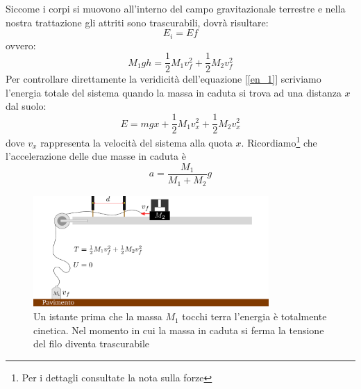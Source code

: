 \documentclass[a4paper,10pt,oneside]{article}
\begin{document}
Siccome i corpi si muovono all'interno del campo gravitazionale terrestre e nella nostra trattazione gli attriti sono trascurabili, dovrà risultare:
\begin{equation}
 E_i=Ef
\end{equation}
ovvero:
\begin{equation}\label{en_1}
 M_1gh=\frac 1 2 M_1v_f^2+\frac 1 2 M_2 v_f^2
\end{equation}
Per controllare direttamente la veridicità dell'equazione [\ref{en_1}] scriviamo l'energia totale del sistema quando la massa in caduta si trova ad una distanza $x$ dal suolo:
\begin{equation}\label{en_2}
 E=mgx+\frac 1 2 M_1v_x^2+\frac 1 2 M_2 v_x^2
\end{equation}
dove $v_x$ rappresenta la velocità del sistema alla quota $x$. Ricordiamo\footnote{Per i dettagli consultate la nota sulla forze} che l'accelerazione delle due masse in caduta è
\begin{equation}
 a=\frac{M_1}{M_1+M_2}g
\end{equation}


\begin{figure}[H]
 \centering
 \includegraphics[width=0.8\textwidth]{./immagini/energia_fine.png}
 \caption{Un istante prima che la massa  $M_1$ tocchi terra l'energia è totalmente cinetica. Nel momento in cui la massa in caduta si ferma la tensione del filo diventa trascurabile}
 \label{fig:energia_fine}
\end{figure}
\end{document}
